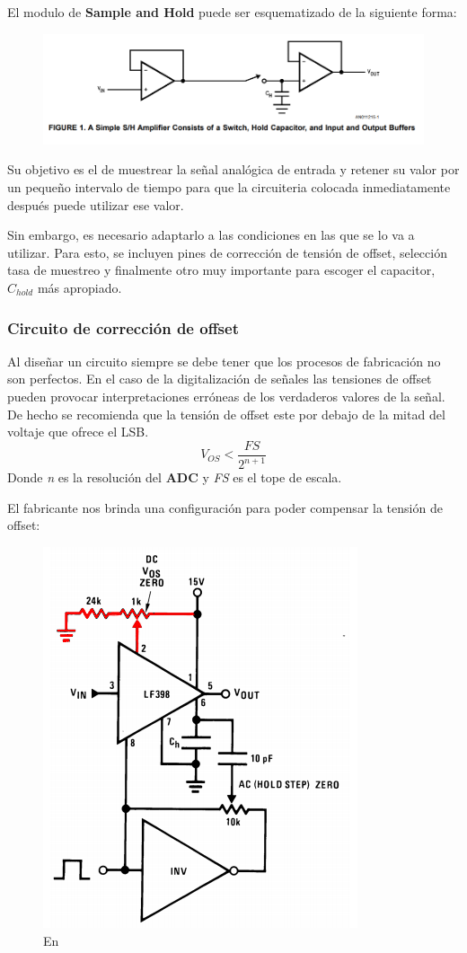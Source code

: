 


El modulo de \textbf{Sample and Hold}  puede ser esquematizado de la siguiente forma:

\begin{figure}[H]
	\centering
	\includegraphics[width=0.7\linewidth]{ImagenesEjercicio4/SyH}
	\caption{}
	\label{fig:syh}
\end{figure}

Su objetivo es el de muestrear la señal analógica de entrada y retener su valor por un pequeño intervalo de tiempo para que la circuiteria colocada inmediatamente después puede utilizar ese valor.

 Sin embargo, es necesario adaptarlo a las condiciones en las que se lo va a utilizar. Para esto, se incluyen pines de corrección de tensión de offset, selección tasa de muestreo y finalmente otro muy importante para escoger el capacitor, $C_{hold}$ más apropiado.
 
 \subsubsection{Circuito de corrección de offset}
 Al diseñar un circuito siempre se debe tener que los procesos de fabricación no son perfectos. En el caso de la digitalización de señales las tensiones de offset pueden provocar interpretaciones erróneas de los verdaderos valores de la señal. De hecho se recomienda que la tensión de offset este por debajo de la mitad del voltaje que ofrece el LSB.
 $$
 V_{OS} < \frac{FS}{2^{n+1}} 
 $$
Donde \textit{n }es la resolución del \textbf{ADC}
y \textit{FS} es el tope de escala.

El fabricante nos brinda una configuración para poder compensar la tensión de offset:
\begin{figure}[H]
	\centering
	\includegraphics[scale=0.6]{ImagenesEjercicio4/DCcolorized}
	\caption{En \color[red]{rojo}}
	\label{fig:dccolorized}
\end{figure}


